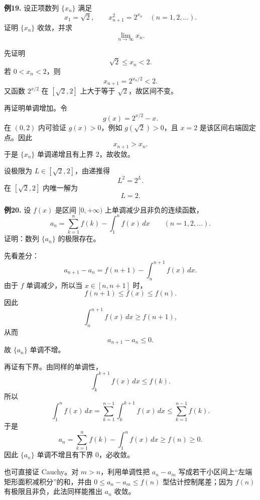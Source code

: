 \begin{problemblock}
\textbf{例19.} 设正项数列 \(\{x_n\}\) 满足
\[
x_1=\sqrt2,\qquad x_{n+1}^2=2^{x_n}\quad(n=1,2,\dots).
\]
证明 \(\{x_n\}\) 收敛，并求
\[
\lim_{n\to\infty}x_n.
\]
\end{problemblock}

\begin{solutionblock}

先证明
\[
\sqrt2\le x_n<2.
\]
若 \(0<x_n<2\)，则
\[
x_{n+1}=2^{x_n/2}<2.
\]
又函数 \(2^{x/2}\) 在 \([\sqrt2,2]\) 上大于等于 \(\sqrt2\)，故区间不变。

再证明单调增加。令
\[
g(x)=2^{x/2}-x.
\]
在 \((0,2)\) 内可验证 \(g(x)>0\)，例如 \(g(\sqrt2)>0\)，且 \(x=2\) 是该区间右端固定点。因此
\[
x_{n+1}>x_n.
\]
于是 \(\{x_n\}\) 单调递增且有上界 2，故收敛。

设极限为 \(L\in[\sqrt2,2]\)，由递推得
\[
L^2=2^L.
\]
在 \([\sqrt2,2]\) 内唯一解为
\[
L=2.
\]

\end{solutionblock}

\begin{problemblock}
\textbf{例20.} 设 \(f(x)\) 是区间 \([0,+\infty)\) 上单调减少且非负的连续函数，
\[
a_n=\sum_{k=1}^n f(k)-\int_1^n f(x)\,dx\qquad(n=1,2,\dots).
\]
证明：数列 \(\{a_n\}\) 的极限存在。
\end{problemblock}

\begin{solutionblock}

先看差分：
\[
a_{n+1}-a_n
=f(n+1)-\int_n^{n+1}f(x)\,dx.
\]
由于 \(f\) 单调减少，所以当 \(x\in[n,n+1]\) 时，
\[
f(n+1)\le f(x)\le f(n).
\]
因此
\[
\int_n^{n+1}f(x)\,dx\ge f(n+1),
\]
从而
\[
a_{n+1}-a_n\le0.
\]
故 \(\{a_n\}\) 单调不增。

再证有下界。由同样的单调性，
\[
\int_k^{k+1}f(x)\,dx\le f(k).
\]
所以
\[
\int_1^n f(x)\,dx
=\sum_{k=1}^{n-1}\int_k^{k+1}f(x)\,dx
\le \sum_{k=1}^{n-1}f(k).
\]
于是
\[
a_n
=\sum_{k=1}^n f(k)-\int_1^n f(x)\,dx
\ge f(n)\ge0.
\]
因此 \(\{a_n\}\) 单调不增且有下界 0，必收敛。

也可直接证 Cauchy。对 \(m>n\)，利用单调性把 \(a_n-a_m\) 写成若干小区间上“左端矩形面积减积分”的和，并由 \(0\le a_n-a_m\le f(n)\) 型估计控制尾差；因为 \(f(n)\) 有极限且非负，此法同样能推出 \(a_n\) 收敛。
\end{solutionblock}

